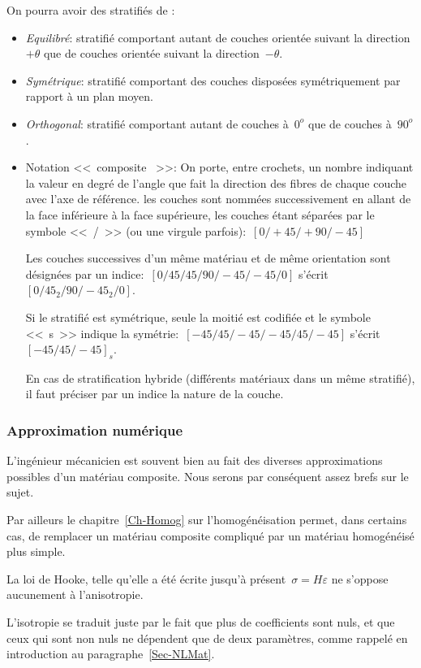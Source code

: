 \medskip
On pourra avoir des stratifiés de :
\begin{itemize}
	\item \emph{Equilibré}: stratifié comportant autant de couches orientée suivant la direction
		$+\theta$ que de couches orientée suivant la direction~$-\theta$.
	\item \emph{Symétrique}: stratifié comportant des couches disposées symétriquement par
		 rapport à un plan moyen.
	\item \emph{Orthogonal}: stratifié comportant autant de couches à~$0^o$ que de couches à~$90^o$.
	\item Notation <<~composite ~>>:
		On porte, entre crochets, un nombre indiquant la valeur en degré de l'angle que fait la direction
		des fibres de chaque couche avec l'axe de référence. les couches sont nommées successivement
		en allant de la face inférieure à la face supérieure, les couches étant séparées par le symbole
		<<~/~>> (ou une virgule parfois):~$[0/+45/+90/-45]$

		Les couches successives d'un même matériau et de même orientation sont désignées
		par un indice:~$[0/45/45/90/-45/-45/0]$ s'écrit~$[0/45_2/90/-45_2/0]$.
		
		Si le stratifié est symétrique, seule la moitié est codifiée et le symbole <<~s~>> indique
		la symétrie:~$[-45/45/-45/-45/45/-45]$ s'écrit~$[-45/45/-45]_s$.

		En cas de stratification hybride (différents matériaux dans un même stratifié), il faut
		préciser par un indice la nature de la couche.
\end{itemize}


\medskip
\subsubsection{Approximation numérique}

L'ingénieur mécanicien est souvent bien au fait des diverses approximations possibles d'un
matériau composite. Nous serons par conséquent assez brefs sur le sujet.

Par ailleurs le chapitre~\ref{Ch-Homog} sur l'homogénéisation permet, dans certains cas, de remplacer
un matériau composite compliqué par un matériau homogénéisé plus simple.

\medskip
La loi de Hooke, telle qu'elle a été écrite jusqu'à présent~$\sigma=H\varepsilon$ ne s'oppose
aucunement à l'anisotropie.

L'isotropie se traduit juste par le fait que plus de coefficients sont nuls,
et que ceux qui sont non nuls ne dépendent que de deux paramètres, comme rappelé
en introduction au paragraphe~\ref{Sec-NLMat}.


